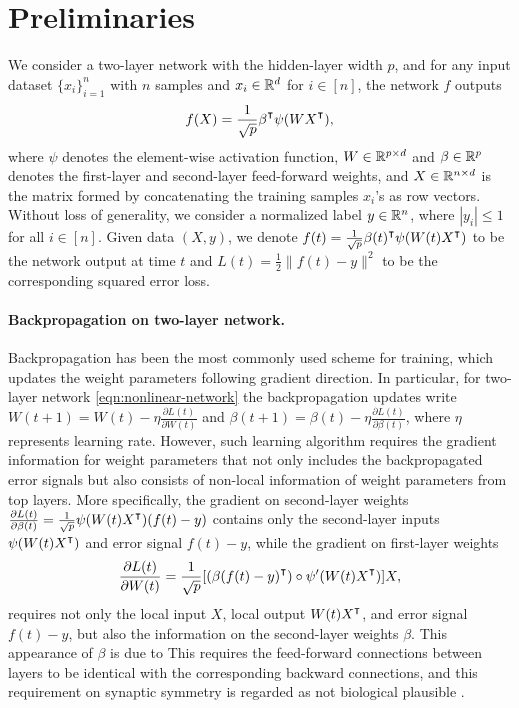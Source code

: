 \section{Preliminaries}

We consider a two-layer network with the hidden-layer width $p$, and for any input dataset $\{x_i\}_{i=1}^n$ with $n$ samples and $x_i\in{\mathbb{R}^{d}}$ for $i\in[n]$, the network $f$ outputs 
\begin{align}\label{eqn:nonlinear-network}
    f(X) = \frac{1}{\sqrt p}\beta\transpose\psi(WX\transpose),
\end{align}
where $\psi$ denotes the element-wise activation function, $W\in{\mathbb{R}^{p\times d}}$ and $\beta\in{\mathbb{R}^{p}}$ denotes the first-layer and second-layer feed-forward weights, and $X\in{\mathbb{R}^{n\times d}}$ is the matrix formed by concatenating the training samples $x_i$'s as row vectors. 
Without loss of generality, we consider a normalized label $y\in{\mathbb{R}^n}$, where $|y_i|\leq 1$ for all $i\in[n]$.
Given data $(X,y)$, we denote $f(t) = \frac{1}{\sqrt p}\beta(t)\transpose\psi(W(t)X\transpose)$ to be the network output at time $t$ and $L(t) = \frac{1}{2}\|f(t)-y\|^2$ to be the corresponding squared error loss.

\paragraph{Backpropagation on two-layer network.}

Backpropagation has been the most commonly used scheme for training, which updates the weight parameters following gradient direction. In particular, for two-layer network \eqref{eqn:nonlinear-network} the backpropagation updates write $W(t+1) = W(t) - \eta \frac{\partial L(t)}{\partial W(t)}$ and $\beta(t+1) = \beta(t) - \eta \frac{\partial L(t)}{\partial \beta(t)}$, where $\eta$ represents learning rate. However, such learning algorithm requires the gradient information for weight parameters that not only includes the backpropagated error signals but also consists of non-local information of weight parameters from top layers. More specifically, the gradient on second-layer weights $\frac{\partial L(t)}{\partial \beta(t)} = \frac{1}{\sqrt{p}} \psi(W(t) X\transpose) (f(t) - y)$ contains only the second-layer inputs $\psi(W(t) X\transpose)$ and error signal $f(t) - y$, while the gradient on first-layer weights 
\begin{align}\label{eqn:backprop-gradient}
    \frac{\partial L(t)}{\partial W(t)} = \frac{1}{\sqrt{p}} [(\beta (f(t) - y)\transpose)\circ \psi'(W(t)X\transpose)] X,
\end{align}
requires not only the local input $X$, local output $W(t)X\transpose$, and error signal $f(t) - y$, but also the information on the second-layer weights $\beta$. This appearance of $\beta$ is due to 
This requires the feed-forward connections between layers to be identical with the corresponding backward connections, and this requirement on synaptic symmetry is regarded as not biological plausible \citep{lillicrap2016random}. 


